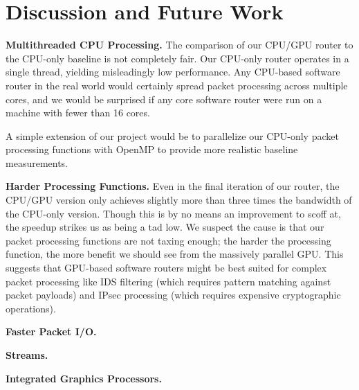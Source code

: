 \section{Discussion and Future Work}

\noindent \textbf{Multithreaded CPU Processing.} The comparison of our CPU/GPU
router to the CPU-only baseline is not completely fair. Our CPU-only router
operates in a single thread, yielding misleadingly low performance. Any
CPU-based software router in the real world would certainly spread packet
processing across multiple cores, and we would be surprised if any core
software router were run on a machine with fewer than 16 cores.

A simple extension of our project would be to parallelize our CPU-only packet
processing functions with OpenMP to provide more realistic baseline
measurements.

\medskip \noindent \textbf{Harder Processing Functions.} Even in the final
iteration of our router, the CPU/GPU version only achieves slightly more than
three times the bandwidth of the CPU-only version. Though this is by no means
an improvement to scoff at, the speedup strikes us as being a tad low. We
suspect the cause is that our packet processing functions are not taxing
enough; the harder the processing function, the more benefit we should see from
the massively parallel GPU. This suggests that GPU-based software routers might
be best suited for complex packet processing like IDS filtering (which requires
pattern matching against packet payloads) and IPsec processing (which requires
expensive cryptographic operations).

\medskip \noindent \textbf{Faster Packet I/O.} 

\medskip \noindent \textbf{Streams.} 

\medskip \noindent \textbf{Integrated Graphics Processors.} 
